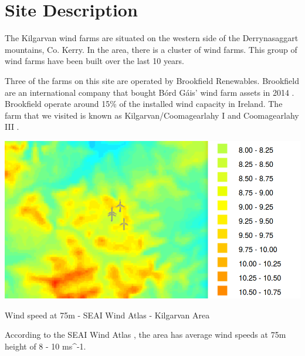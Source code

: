 \documentclass[12pt]{article} %
\begin{document}




\section{Site Description} %

The Kilgarvan wind farms are situated on the western side of the Derrynasaggart mountains, Co. Kerry. In the area, there is a cluster of wind farms. This group of wind farms have been built over the last 10 years.

Three of the farms on this site are operated by Brookfield Renewables. Brookfield are an international company that bought Bórd Gáis' wind farm assets in 2014 \cite{silicon_republic}. Brookfield operate around 15\% of the installed wind capacity in Ireland.
The farm that we visited is known as Kilgarvan/Coomagearlahy I and Coomagearlahy III \cite{iwea}.

  \begin{center}
    \includegraphics[width=1\textwidth]{seai_wind_atlas_kilgarvan}
  \end{center}
  \caption{Wind speed at 75m - SEAI Wind Atlas - Kilgarvan Area}

According to the SEAI Wind Atlas \cite{seai_atlas}, the area has average wind speeds at 75m height of 8 - 10 ms^-1.
\end{document}
